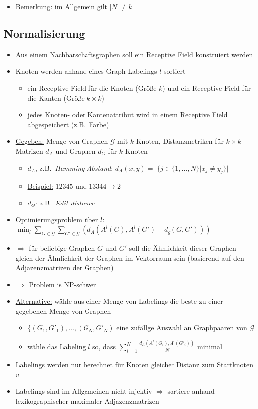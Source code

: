 \begin{itemize}
  \item \underline{Bemerkung:} im Allgemein gilt $|N| \neq k$
\end{itemize}

\subsection{Normalisierung}

\begin{itemize}
  \item Aus einem Nachbarschaftsgraphen soll ein Receptive Field konstruiert werden
  \item Knoten werden anhand eines Graph-Labelings $l$ sortiert
  \begin{itemize}
    \item ein Receptive Field für die Knoten (Größe $k$) und ein Receptive Field für die Kanten (Größe $k \times k$)
    \item jedes Knoten- oder Kantenattribut wird in einem Receptive Field abgespeichert (z.B.\ Farbe)
  \end{itemize}
  \item \underline{Gegeben:} Menge von Graphen $\mathcal{G}$ mit $k$ Knoten, Distanzmetriken für $k \times k$ Matrizen $d_A$ und Graphen $d_G$ für $k$ Knoten
  \begin{itemize}
    \item $d_A$, z.B.\ \emph{Hamming-Abstand}: $d_A(x, y) = | \lbrace j \in \lbrace 1, \ldots, N \rbrace | x_j \neq y_j \rbrace |$
    \item \underline{Beispiel:} $12345$ und $13344 \rightarrow 2$
    \item $d_G$: z.B.\ \emph{Edit distance}
  \end{itemize}
  \item \underline{Optimierungsproblem über $l$:} $\min_l \sum_{G \in \mathcal{G}} \sum_{G' \in \mathcal{G}} {( d_A(A^l(G), A^l(G') - d_g(G, G')) )}$
  \item $\Rightarrow$ für beliebige Graphen $G$ und $G'$ soll die Ähnlichkeit dieser Graphen gleich der Ähnlichkeit der Graphen im Vektorraum sein (basierend auf den Adjazenzmatrizen der Graphen)
  \item $\Rightarrow$ Problem is NP-schwer
  \item \underline{Alternative:} wähle aus einer Menge von Labelings die beste zu einer gegebenen Menge von Graphen
  \begin{itemize}
    \item $\lbrace (G_1, G'_1), \ldots, (G_N, G'_N)$ eine zufällge Auswahl an Graphpaaren von $\mathcal{G}$
    \item wähle das Labeling $l$ so, dass $\sum_{i=1}^N \frac{d_A(A^l(G_i), A^l(G'_i))}{N}$ minimal
  \end{itemize}
  \item Labelings werden nur berechnet für Knoten gleicher Distanz zum Startknoten $v$
  \item Labelings sind im Allgemeinen nicht injektiv $\Rightarrow$ sortiere anhand lexikographischer maximaler Adjazenzmatrizen
\end{itemize}

